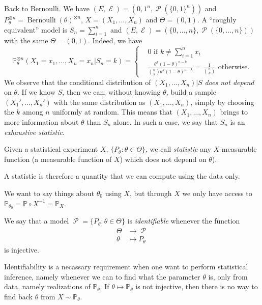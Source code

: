 \documentclass[
	fontsize=11pt, %
	twoside=false, %
	numbers=noenddot, %
]{kaobook}
\DeclareMathOperator{\cE}{\mathcal E}
\DeclareMathOperator{\cP}{\mathcal P}
\DeclareMathOperator{\ber}{Bernoulli}
\renewcommand{\P}{\mathbb P}
\begin{document}
Back to Bernoulli. We have $(E, \cE) = ({0, 1}^n, \cP(\{0, 1\}^n))$ and $P_\theta^{\otimes n} = \ber(\theta)^{\otimes n}$, $X = (X_1, \ldots, X_n)$ and $\Theta = (0, 1)$.
A ``roughly equivalent'' model is $S_n = \sum_{i=1}^n$ and $(E, \cE) = (\{ 0, \ldots, n\}, \cP(\{0, \ldots, n\}))$ with the same $\Theta = (0, 1)$.
Indeed, we have
\begin{equation*}
	\P_\theta^{\otimes n} (X_1 = x_1, \ldots, X_n = x_n | S_n=k) =
	\begin{cases}
	 & 0 \text{ if } k \neq \sum_{i=1}^n x_i \\
	 & \frac{\theta^k (1 - \theta)^{n-k}}{\binom{n}{k} 
	 \theta^k (1 - \theta)^{n-k}} = \frac{1}{\binom{n}{k} } \text{ otherwise.}
	\end{cases}
\end{equation*}
We observe that the conditional distribution of $(X_1, \ldots, X_n) | S$ \emph{does not depend} on $\theta$.
If we know $S$, then we can, without knowing $\theta$, build a sample $(X_1', \ldots, X_n')$ with the same distribution as $(X_1, \ldots, X_n)$, simply by choosing the $k$ among $n$ uniformly at random.
This means that $(X_1, \ldots, X_n)$ brings to more information about $\theta$ than $S_n$ alone.
In such a case, we say that $S_n$ is an \emph{exhaustive statistic}.

\begin{definition}
	Given a statistical experiment $X$, $\{ P_\theta : \theta \in \Theta \}$, we call \emph{statistic} any $X$-measurable function (a measurable function of $X$) which does not depend on $\theta$).
\end{definition}
A statistic is therefore a quantity that we can compute using the data only.


We want to say things about $\theta_0$ using $X$, but through $X$ we only have access to $\P_{\theta_0} = \P \circ X^{-1} = \P_X$.

\begin{definition}
	We say that a model $\cP = \{ P_\theta : \theta \in \Theta \}$ is \emph{identifiable} whenever the function
	\begin{align*}
		\Theta &\rightarrow \cP \\
		\theta &\mapsto P_\theta
	\end{align*}
	is injective.
\end{definition}


Identifiability is a necassary requirement when one want to perform statistical inference, namely whenever we can to find what the parameter $\theta$ is, only from data, namely realizations of $\P_\theta$.
If $\theta \mapsto \P_\theta$ is not injective, then there is no way to find back $\theta$ from $X \sim \P_\theta$.
\end{document}
